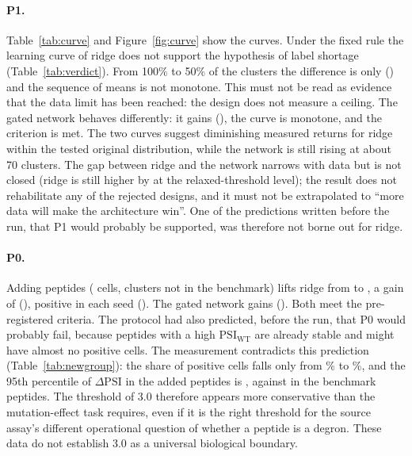 \begin{table}[htbp]
  \centering
  \caption[Learning curve (P1) and relaxed degron threshold 4.0 (P0)]{Learning curve (P1) and relaxed degron threshold 4.0 (P0). Ranges are over 5 folds and 3 seeds.}\label{tab:curve}
  
\end{table}

\paragraph{P1.} Table~\ref{tab:curve} and Figure~\ref{fig:curve} show the curves. Under the fixed rule the learning curve of ridge does not support the hypothesis of label shortage
(Table~\ref{tab:verdict}). From 100\% to 50\% of the clusters the difference is only \nPoneRidgeD{} (\nPoneRidgeCI{}) and
the sequence of means is not monotone. This must not be read as evidence that the data limit has been reached: the design does not
measure a ceiling. The gated network behaves differently: it gains \nPoneGateD{} (\nPoneGateCI{}), the curve is
monotone, and the criterion is met. The two curves suggest diminishing measured returns for ridge
within the tested original distribution, while the network is still rising at about 70 clusters.
The gap between ridge and the network narrows with data but is not closed (ridge is still higher by \nGapExt{}
at the relaxed-threshold level); the result does not rehabilitate any of the rejected designs, and it must
not be extrapolated to ``more data will make the architecture win''. One of the predictions written before the run,
that P1 would probably be supported, was therefore not borne out for ridge.

\paragraph{P0.} Adding \nNNewPep{} peptides (\nNNewCells{} cells, \nNNewClu{} clusters not in the benchmark) lifts ridge from
\nAucRidge{} to \nAucRidgeExt{}, a gain of \nPzeroRidgeD{} (\nPzeroRidgeCI{}), positive in each seed
(\nPzeroRidgeSeeds). The gated network gains \nPzeroGateD{} (\nPzeroGateCI{}). Both meet the pre-registered
criteria. The protocol had also predicted, before the run, that P0 would probably fail, because
peptides with a high $\mathrm{PSI}_{\mathrm{WT}}$ are already stable and might have almost no positive cells.
The measurement contradicts this prediction (Table~\ref{tab:newgroup}): the share of positive cells falls only from
\nPosBase\% to \nPosNew\%, and the 95th percentile of $\Delta\mathrm{PSI}$ in the added peptides is \nDpsiPNinetyFiveNew{}, against \nDpsiPNinetyFiveBase{} in the benchmark peptides. The threshold of 3.0
therefore appears more conservative than the mutation-effect task requires, even if it is the right threshold
for the source assay's different operational question of whether a peptide is a degron. These data do
not establish 3.0 as a universal biological boundary.

